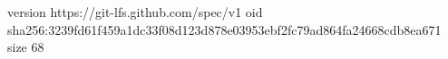 version https://git-lfs.github.com/spec/v1
oid sha256:3239fd61f459a1dc33f08d123d878e03953ebf2fc79ad864fa24668cdb8ea671
size 68
